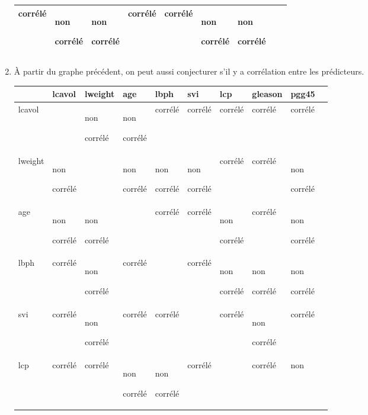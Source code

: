 \documentclass[a4paper, 12pt]{article}
\begin{document}
\begin{enumerate}
\begin{tabular}{|p{0.5cm}|p{1.5cm}|p{1.5cm}|p{1.5cm}|p{1.5cm}|p{1.5cm}|p{1.5cm}|p{1.5cm}|p{1.5cm}|}
   corrélé & non 

    corrélé & non

     corrélé & corrélé & corrélé & non

      corrélé & non

       corrélé \\
  \hline 
\end{tabular}


\item 
À partir du graphe précédent, on peut aussi conjecturer s'il y a corrélation entre les prédicteurs.

\begin{tabular}{|p{1.4cm}|p{1.4cm}|p{1.4cm}|p{1.4cm}|p{1.4cm}|p{1.4cm}|p{1.4cm}|p{1.4cm}|p{1.4cm}|p{1.4cm}|}
  \hline
       & lcavol & lweight & age & lbph & svi & lcp & gleason & pgg45 \\
  \hline
  lcavol &  & non 

  corrélé & non 

   corrélé & corrélé & corrélé & corrélé & corrélé & corrélé \\
  \hline 
  lweight & non 

  corrélé & & non

  corrélé & non

  corrélé & non 

  corrélé & corrélé & corrélé & non

   corrélé \\
   \hline
   age & non 

   corrélé & non 

   corrélé &  & corrélé & corrélé & non 

   corrélé & corrélé & non 

   corrélé \\
   \hline
   lbph & corrélé & non 

   corrélé & corrélé & & corrélé & 
   non 

   corrélé & non 

   corrélé &
   non

   corrélé \\
   \hline
   svi & corrélé & non 

   corrélé & corrélé & corrélé & & corrélé & non 

   corrélé & corrélé \\
   \hline
   lcp & corrélé & corrélé & non 

   corrélé & non 

   corrélé & corrélé &  & corrélé & non


\end{tabular}
\end{enumerate}
\end{document}

